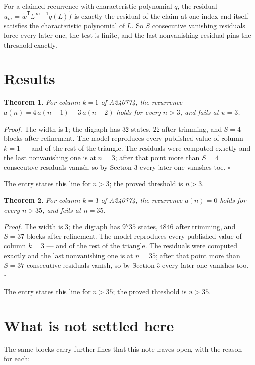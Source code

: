 \documentclass[11pt]{article}
\newtheorem{theorem}{Theorem}
\theoremstyle{definition}
\begin{document}
For a claimed recurrence with characteristic polynomial $q$, the residual $u_m = \tilde w^{\mathsf T}L^{\,m-1}q(L)\tilde f$ is exactly the residual of the claim at one index and itself satisfies the characteristic polynomial of $L$. So $S$ consecutive vanishing residuals force every later one, the test is finite, and the last nonvanishing residual pins the threshold exactly.

\section{Results}

\begin{theorem} For column $k = 1$ of A240774, the recurrence $a(n) = 4\,a(n-1) - 3\,a(n-2)$ holds for every $n > 3$, and fails at $n = 3$.\end{theorem}

{\itshape Proof.} The width is $1$; the digraph has $32$ states, $22$ after trimming, and $S = 4$ blocks after refinement. The model reproduces every published value of column $k = 1$ --- and of the rest of the triangle. The residuals were computed exactly and the last nonvanishing one is at $n = 3$; after that point more than $S = 4$ consecutive residuals vanish, so by Section 3 every later one vanishes too. $\square$

The entry states this line for $n > 3$; the proved threshold is $n > 3$.

\begin{theorem} For column $k = 3$ of A240774, the recurrence $a(n) = 0$ holds for every $n > 35$, and fails at $n = 35$.\end{theorem}

{\itshape Proof.} The width is $3$; the digraph has $9735$ states, $4846$ after trimming, and $S = 37$ blocks after refinement. The model reproduces every published value of column $k = 3$ --- and of the rest of the triangle. The residuals were computed exactly and the last nonvanishing one is at $n = 35$; after that point more than $S = 37$ consecutive residuals vanish, so by Section 3 every later one vanishes too. $\square$

The entry states this line for $n > 35$; the proved threshold is $n > 35$.

\section{What is not settled here}

The same blocks carry further lines that this note leaves open, with the reason for each:
\end{document}
